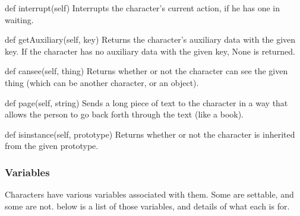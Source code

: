\documentclass[12pt]{article}
\begin{document}
def interrupt(self) \newline
Interrupts the character's current action, if he has one in waiting.

def getAuxiliary(self, key) \newline
Returns the character's auxiliary data with the given key. If the character has no auxiliary data with the given key, None is returned.

def cansee(self, thing) \newline
Returns whether or not the character can see the given thing (which can be another character, or an object).

def page(self, string) \newline
Sends a long piece of text to the character in a way that allows the person to go back forth through the text (like a book).

def isinstance(self, prototype) \newline
Returns whether or not the character is inherited from the given prototype.

\subsubsection{Variables}
Characters have various variables associated with them. Some are settable, and some are not. below is a list of those variables, and details of what each is for.
\end{document}
